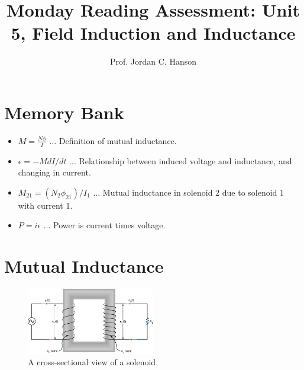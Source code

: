 \documentclass{article}
\begin{document}
\title{Monday Reading Assessment: Unit 5, Field Induction and Inductance}
\author{Prof. Jordan C. Hanson}

\maketitle

\section{Memory Bank}

\begin{itemize}
\item $M = \frac{N\phi}{I}$ ... Definition of mutual inductance.
\item $\epsilon = -M dI/dt$ ... Relationship between induced voltage and inductance, and changing in current.
\item $M_{21} = (N_2 \phi_{21})/I_1$ ... Mutual inductance in solenoid 2 due to solenoid 1 with current 1.
\item $P = i\epsilon$ ... Power is current times voltage.
\end{itemize}

\section{Mutual Inductance}

\begin{figure}
\centering
\includegraphics[width=0.5\textwidth]{transform.jpeg}
\caption{\label{fig:trans} A cross-sectional view of a solenoid.}
\end{figure}
\end{document}
